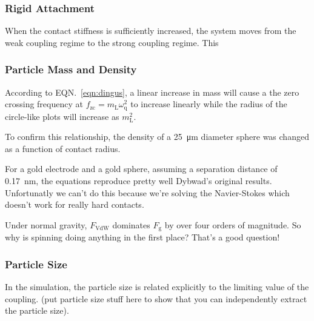 \documentclass[floatfix,superscriptaddress,a4paper,notitlepage]{revtex4-1}
\newcommand{\Equation}[1]{EQN.~\ref{#1}}
\newcommand{\Table}[1]{TBL.~\ref{#1}}
\newcommand{\ml}{m_\mathrm{L}}
\newcommand{\omegaq}{\omega_\mathrm{q}}
\begin{document}


\subsubsection{Rigid Attachment}
When the contact stiffness is sufficiently increased, the system moves from
the weak coupling regime to the strong coupling regime.  This


\subsubsection{Particle Mass and Density}
According to \Equation{eqn:dingus}, a linear increase in mass will cause a
the zero crossing frequency at
$f_\mathrm{zc} = \ml \omegaq^2$ to increase linearly while the radius of
the circle-like plots will increase as $\ml^2$.

To confirm this relationship, the density of a \SI{25}{\micro\meter}
diameter sphere was changed as a function of contact radius.

For a gold electrode and a gold sphere, assuming a separation distance of
\SI{0.17}{\nano\meter}, the equations reproduce pretty well Dybwad's
original results.  Unfortunatly we can't do this because we're solving the
Navier-Stokes which doesn't work for really hard contacts.

Under normal gravity, $F_\mathrm{VdW}$ dominates $F_\mathrm{g}$ by over
four orders of magnitude.  So why is spinning doing anything in the first
place?  That's a good question!

\subsubsection{Particle Size}
In the simulation, the particle size is related explicitly to the limiting
value of the coupling.
(put particle size stuff here to show that you can independently extract
the particle size).
\end{document}
